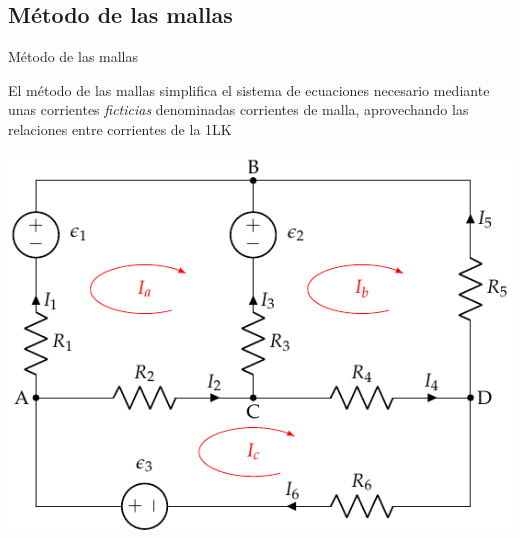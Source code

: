 \documentclass[aspectratio=169, xcolor={usenames,svgnames,dvipsnames}]{beamer}
\begin{document}

\subsection{Método de las mallas}

\begin{frame}{Método de las mallas}

    \vspace{2mm}
    El método de las mallas simplifica el sistema de ecuaciones necesario mediante unas corrientes \emph{ficticias} denominadas \alert{corrientes de malla}, aprovechando las relaciones entre corrientes de la 1LK

    \vspace{-2mm}
    \begin{center}
    \includegraphics[height=0.7\textheight]{../figs/mallas1_corrientes.pdf}
    \end{center}
\end{frame}

\end{document}
